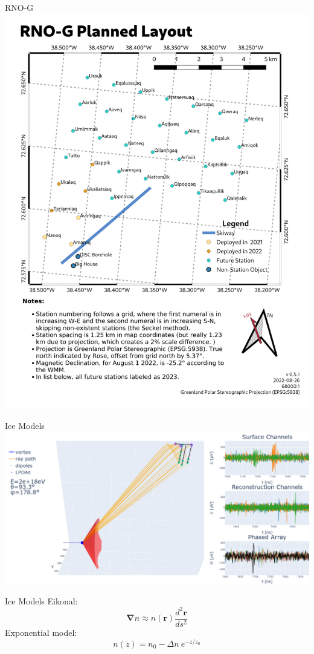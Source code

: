 \documentclass{beamer}
\begin{document}
\begin{frame}{RNO-G}
  \centering
  \includegraphics[height=\textheight]{figures/station-map.png}
\end{frame}
\begin{frame}{Ice Models}
  \centering
  \includegraphics[width=\textwidth]{figures/mechanism.png}
\end{frame}
\begin{frame}{Ice Models}
Eikonal:
  \begin{equation}
    \mathbf{\nabla} n \approx n(\mathbf{r})\frac{d^2\mathbf{r}}{ds^2}
  \end{equation}
Exponential model:
  \begin{equation}
    n(z) = n_0 - \Delta n \ e^{-z/z_0}
  \end{equation}
\end{frame}
\end{document}

